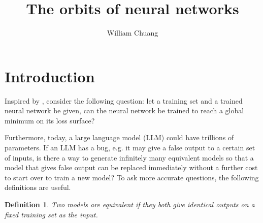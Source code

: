 \documentclass{article}
\theoremstyle{plain}
\theoremstyle{plain} %
\newtheorem{definition}[theorem]{Definition}
\theoremstyle{definition}  %
\theoremstyle{remark}  %
\theoremstyle{plain}
\begin{document}
\title{The orbits of neural networks}

\author{William Chuang}

\maketitle


\section{Introduction}
Inspired by \cite{yun2017global, blum1988training, judd1990neural}, consider the following question:
let a training set and a trained neural network be given, can the neural network be trained to reach a global minimum on its loss surface?




Furthermore, today, a large language model (LLM) could have trillions of parameters. If an LLM has a bug, e.g. it may give a false output to a certain set of inputs, is there a way to generate infinitely many equivalent models so that a model that gives false output can be replaced immediately without a further cost to start over to train a new model? To ask more accurate questions, the following definitions are useful.

\begin{definition}
\textit{Two models are equivalent} if they both give identical outputs on a fixed training set as the input.
\end{definition}
\end{document}
